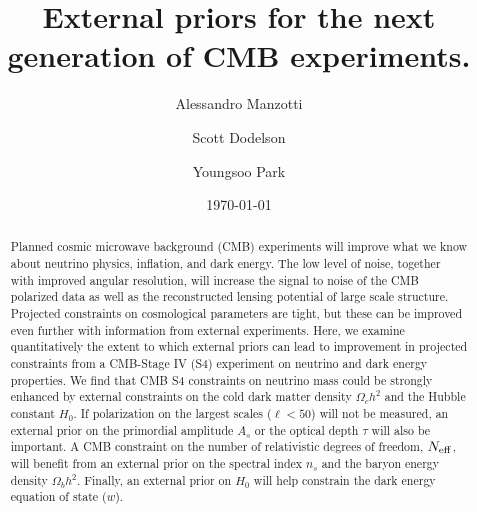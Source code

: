 \documentclass[aps,prd,reprint,superscriptaddress,nofootinbib]{revtex4-1}
\begin{document}
\graphicspath{{./images/}}

\title{External priors for the next generation of CMB experiments.}
\author{Alessandro Manzotti}
\author{Scott Dodelson}


\author{Youngsoo Park}


\date{\today}
\begin{abstract}
Planned cosmic microwave background (CMB) experiments will improve what we know about neutrino physics, inflation, and dark energy. 
The low level of noise, together with improved angular resolution, will increase the signal to noise of the CMB polarized data as well as the reconstructed lensing potential of large scale structure. Projected constraints on cosmological parameters are tight, but these can be improved even further with information from external experiments. Here, we examine quantitatively the extent to which external priors can lead to improvement in projected constraints from a CMB-Stage IV (S4) experiment on neutrino and dark energy properties.
We find that CMB S4 constraints on neutrino mass could be strongly enhanced by external constraints on the cold dark matter density $\Omega_{c}h^{2}$ and the Hubble constant $H_{0}$. If polarization on the largest scales ($\ell<50$) will not be measured, an external prior on the primordial amplitude $A_{s}$ or the optical depth $\tau$ will also be important. A CMB constraint on the number of relativistic degrees of freedom, $N_{\rm eff}$, will benefit from an external prior on the spectral index $n_{s}$ and the baryon energy density $\Omega_{b}h^{2}$. Finally, an external prior on $H_{0}$ will help constrain the dark energy equation of state ($w$).
\end{abstract}

\pacs{}
\maketitle
\end{document}
